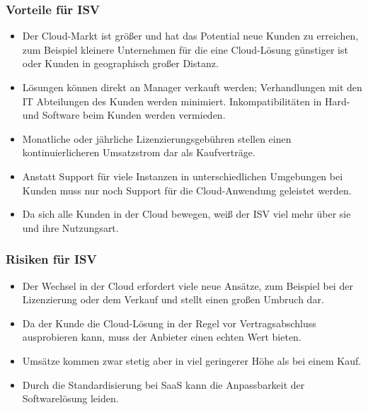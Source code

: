 \subsubsection{Vorteile für ISV}
\begin{itemize}
	\item Der Cloud-Markt ist größer und hat das Potential neue Kunden zu
erreichen, zum Beispiel kleinere Unternehmen für die eine Cloud-Lösung
günstiger ist oder Kunden in geographisch großer Distanz.
	\item Lösungen können direkt an Manager verkauft werden; Verhandlungen
mit den IT Abteilungen des Kunden werden minimiert. Inkompatibilitäten in Hard-
und Software beim Kunden werden vermieden.
	\item Monatliche oder jährliche Lizenzierungsgebühren stellen einen
kontinuierlicheren Umsatzstrom dar als Kaufverträge.
	\item Anstatt Support für viele Instanzen in unterschiedlichen
Umgebungen bei Kunden muss nur noch Support für die Cloud-Anwendung
geleistet werden.
	\item Da sich alle Kunden in der Cloud bewegen, weiß der ISV viel mehr
über sie und ihre Nutzungsart.
\end{itemize}

\subsubsection{Risiken für ISV}
\begin{itemize}
	\item Der Wechsel in der Cloud erfordert viele neue Ansätze, zum
Beispiel bei der Lizenzierung oder dem Verkauf und stellt einen großen Umbruch
dar.
	\item Da der Kunde die Cloud-Lösung in der Regel vor
Vertragsabschluss ausprobieren kann, muss der Anbieter einen echten Wert
bieten.
	\item Umsätze kommen zwar stetig aber in viel geringerer Höhe als bei
einem Kauf.
	\item Durch die Standardisierung bei SaaS kann die Anpassbarkeit
der Softwarelösung leiden.
\end{itemize}

